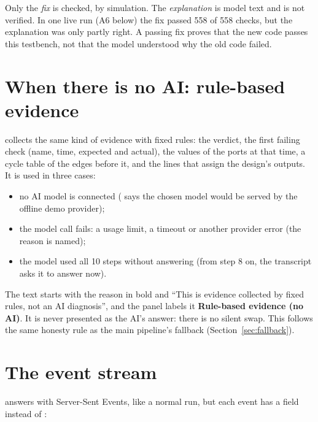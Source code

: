 \begin{warnbox}
Only the \emph{fix} is checked, by simulation. The \emph{explanation} is model text and is not verified. In one live run (A6 below) the fix passed 558 of 558 checks, but the explanation was only partly right. A passing fix proves that the new code passes this testbench, not that the model understood why the old code failed.
\end{warnbox}

\section{When there is no AI: rule-based evidence}

 collects the same kind of evidence with fixed rules: the verdict, the first failing check (name, time, expected and actual), the values of the ports at that time, a cycle table of the edges before it, and the lines that assign the design's outputs. It is used in three cases:
\begin{itemize}
  \item no AI model is connected ( says the chosen model would be served by the offline demo provider);
  \item the model call fails: a usage limit, a timeout or another provider error (the reason is named);
  \item the model used all 10 steps without answering (from step 8 on, the transcript asks it to answer now).
\end{itemize}
The text starts with the reason in bold and ``This is evidence collected by fixed rules, not an AI diagnosis'', and the panel labels it \textbf{Rule-based evidence (no AI)}. It is never presented as the AI's answer: there is no silent swap. This follows the same honesty rule as the main pipeline's fallback (Section~\ref{sec:fallback}).

\section{The event stream}

 answers with Server-Sent Events, like a normal run, but each event has a  field instead of :

